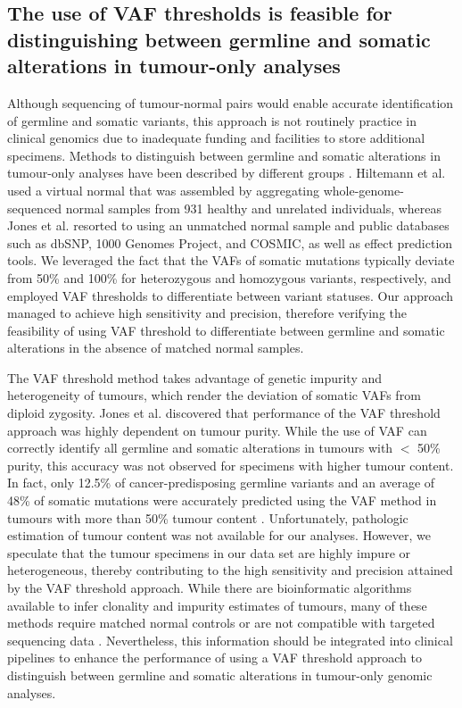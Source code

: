 \subsection{The use of VAF thresholds is feasible for distinguishing between germline and somatic alterations in tumour-only analyses}

Although sequencing of tumour-normal pairs would enable accurate identification of germline and somatic variants, this approach is not routinely practice in clinical genomics due to inadequate funding and facilities to store additional specimens. Methods to distinguish between germline and somatic alterations in tumour-only analyses have been described by different groups \cite{Hiltemann2015, Jones2015a, Garofalo2016}. Hiltemann et al. \cite{Hiltemann2015} used a virtual normal that was assembled by aggregating whole-genome-sequenced normal samples from 931 healthy and unrelated individuals, whereas Jones et al. \cite{Jones2015a} resorted to using an unmatched normal sample and public databases such as dbSNP, 1000 Genomes Project, and COSMIC, as well as effect prediction tools. We leveraged the fact that the VAFs of somatic mutations typically deviate from 50\% and 100\% for heterozygous and homozygous variants, respectively, and employed VAF thresholds to differentiate between variant statuses. Our approach managed to achieve high sensitivity and precision, therefore verifying the feasibility of using VAF threshold to differentiate between germline and somatic alterations in the absence of matched normal samples.

The VAF threshold method takes advantage of genetic impurity and heterogeneity of tumours, which render the deviation of somatic VAFs from diploid zygosity. Jones et al. \cite{Jones2015a} discovered that performance of the VAF threshold approach was highly dependent on tumour purity. While the use of VAF can correctly identify all germline and somatic alterations in tumours with $<$ 50\% purity, this accuracy was not observed for specimens with higher tumour content. In fact, only 12.5\% of cancer-predisposing germline variants and an average of 48\% of somatic mutations were accurately predicted using the VAF method in tumours with more than 50\% tumour content \cite{Jones2015a}. Unfortunately, pathologic estimation of tumour content was not available for our analyses. However, we speculate that the tumour specimens in our data set are highly impure or heterogeneous, thereby contributing to the high sensitivity and precision attained by the VAF threshold approach. While there are bioinformatic algorithms available to infer clonality and impurity estimates of tumours, many of these methods require matched normal controls or are not compatible with targeted sequencing data \cite{Yadav2015}. Nevertheless, this information should be integrated into clinical pipelines to enhance the performance of using a VAF threshold approach to distinguish between germline and somatic alterations in tumour-only genomic analyses.

